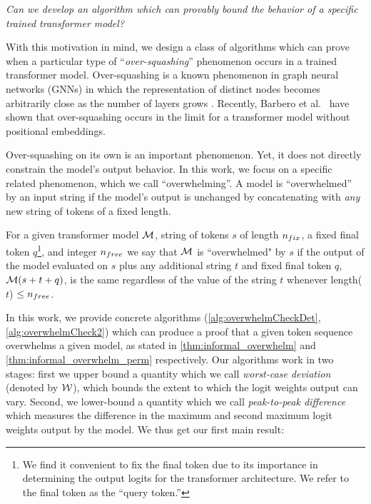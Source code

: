 	\textit{
	Can we develop an algorithm which can provably bound the behavior of a specific trained transformer model?}

With this motivation in mind, we design a class of algorithms which can prove when a particular type of ``\emph{over-squashing}'' phenomenon occurs in a trained transformer model.
Over-squashing is a known phenomenon in graph neural networks (GNNs) in which the representation of distinct nodes becomes arbitrarily close as the number of layers grows \cite{alon2021bottleneckgraphneuralnetworks, barbero2024transformers}.
Recently, Barbero et al.~\cite{barbero2024transformers} have shown that over-squashing occurs in the limit for a transformer model without positional embeddings.

Over-squashing on its own is an important phenomenon.
Yet, it does not directly constrain the model's output behavior.
In this work, we focus on a specific related phenomenon, which we call ``overwhelming''.
A model is ``overwhelmed'' by an input string if the model's output is unchanged by concatenating with \emph{any} new string of tokens of a fixed length.

\begin{definition}
    For a given transformer model $\mathcal{M}$, string of tokens $s$ of length $n_{fix}$, a fixed final token $q$\footnote{
We find it convenient to fix the final token due to its importance in determining the output logits for the transformer architecture.
We refer to the final token as the ``query token.''}, and integer $n_{free}$ we say that $\mathcal{M}$ is ``overwhelmed" by $s$ if the output of the model evaluated on $s$ plus any additional string $t$ and fixed final token $q$, $\mathcal{M}(s + t + q)$, is the same regardless of the value of the string $t$ whenever length($t$) $\leq n_{free}$.
\end{definition}

In this work, we provide concrete algorithms (\cref{alg:overwhelmCheckDet}, \cref{alg:overwhelmCheck2}) which can produce a proof that a given token sequence overwhelms a given model, as stated in \cref{thm:informal_overwhelm} and \cref{thm:informal_overwhelm_perm} respectively. 
Our algorithms work in two stages: first we upper bound a quantity which we call \emph{worst-case deviation} (denoted by $\mathcal{W}$), which bounds the extent to which the logit weights output can vary.
Second, we lower-bound a quantity which we call \emph{peak-to-peak difference} which measures the difference in the maximum and second maximum logit weights output by the model.
We thus get our first main result:

